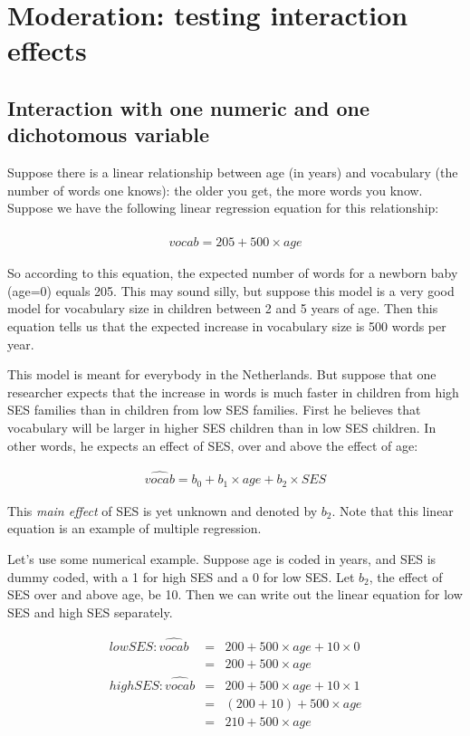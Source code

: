
\chapter{Moderation: testing interaction effects}\label{chap:moderation}





\section{Interaction with one numeric and one dichotomous variable}

Suppose there is a linear relationship between age (in years) and vocabulary (the number of words one knows): the older you get, the more words you know. Suppose we have the following linear regression equation for this relationship:


\begin{eqnarray}
\widehat{vocab} = 205 + 500 \times age 
\end{eqnarray}

So according to this equation, the expected number of words for a newborn baby (age=0) equals 205. This may sound silly, but suppose this model is a very good model for vocabulary size in children between 2 and 5 years of age. Then this equation tells us that the expected increase in vocabulary size is 500 words per year.

This model is meant for everybody in the Netherlands. But suppose that one researcher expects that the increase in words is much faster in children from high SES families than in children from low SES families. First he believes that vocabulary will be larger in higher SES children than in low SES children. In other words, he expects an effect of SES, over and above the effect of age:

\begin{eqnarray}
\widehat{vocab} = b_0 + b_1 \times age + b_2 \times SES
\end{eqnarray}

This \textit{main effect} of SES is yet unknown and denoted by $b_2$. Note that this linear equation is an example of multiple regression.


Let's use some numerical example. Suppose age is coded in years, and SES is dummy coded, with a 1 for high SES and a 0 for low SES. Let $b_2$, the effect of SES over and above age, be 10. Then we can write out the linear equation for low SES and high SES separately.


\begin{eqnarray}
low SES: \widehat{vocab} &=& 200 + 500 \times age + 10 \times 0  \\
&=& 200 + 500 \times age \\
high SES: \widehat{vocab} &=& 200 + 500 \times age + 10 \times 1  \\
&=& (200+10) + 500 \times age \\
&=& 210 + 500 \times age
\end{eqnarray}

